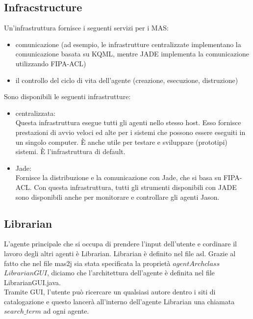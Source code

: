 \documentclass[12pt]{article}
\begin{document}
\subsection{Infracstructure}
Un'infrastruttura fornisce i seguenti servizi per i MAS:
\begin{itemize}
\item comunicazione (ad esempio, le infrastrutture centralizzate implementano la comunicazione basata su KQML, mentre JADE implementa la comunicazione utilizzando FIPA-ACL)
\item il controllo del ciclo di vita dell'agente (creazione, esecuzione, distruzione)
\end{itemize}
Sono disponibili le seguenti infrastrutture:
\begin{itemize}
\item  centralizzata: \\ Questa infrastruttura esegue tutti gli agenti nello stesso host. Esso fornisce prestazioni di avvio veloci ed alte per i sistemi che possono essere eseguiti in un singolo computer. \`E  anche utile per testare e sviluppare (prototipi) sistemi. \`E l'infrastruttura di default.
\item Jade: \\ Fornisce la distribuzione e la comunicazione con Jade, che si basa su FIPA-ACL. Con questa infrastruttura, tutti gli strumenti disponibili con JADE sono disponibili anche per monitorare e controllare gli agenti Jason.
\end{itemize}
\subsection{Librarian}
L'agente principale che si occupa di prendere l'input dell'utente e cordinare il lavoro degli altri agenti \`e Librarian. Librarian \`e definito nel file asl. Grazie al fatto che nel file mas2j sia stata specificata la propriet\`a $agentArchclass$ $LibrarianGUI$, diciamo che l'architettura dell'agente \`e definita nel file LibrarianGUI.java. \\
Tramite GUI, l'utente pu\`o ricercare un qualsiasi autore dentro i siti di catalogazione e questo lancer\`a all'interno dell'agente Librarian una chiamata $search\_term$ ad ogni agente.


\end{document}
